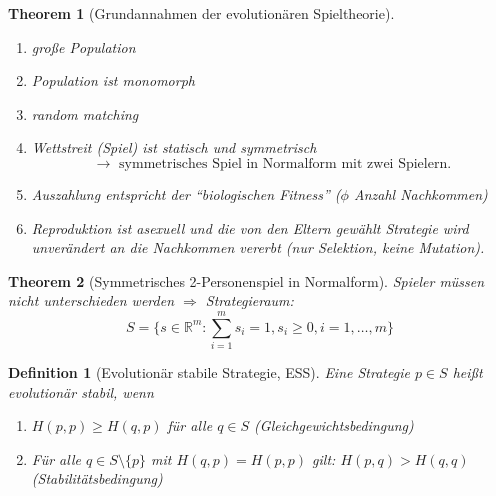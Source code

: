 \documentclass[12pt]{extreport} %
\newcommand{\R}{\mathbb{R}}
\theoremstyle{named}
\newtheorem{unnamedtheorem}{Theorem} \counterwithin{unnamedtheorem}{chapter}
\theoremstyle{itshape}
\newtheorem*{definition}{Definition}
\theoremstyle{normal}
\begin{document}
\begin{unnamedtheorem}[Grundannahmen der evolutionären Spieltheorie]
	\begin{enumerate}
		\item große Population
		\item Population ist monomorph
		\item random matching
		\item Wettstreit (Spiel) ist statisch und symmetrisch
			$$ \rightarrow \text{ symmetrisches Spiel in Normalform mit zwei Spielern}. $$
		\item Auszahlung entspricht der \enquote{biologischen Fitness} ($\phi$ Anzahl Nachkommen)
		\item Reproduktion ist asexuell und die von den Eltern gewählt Strategie wird unverändert an die Nachkommen vererbt (nur Selektion, keine Mutation).
	\end{enumerate}
\end{unnamedtheorem} 
 

\begin{unnamedtheorem}[Symmetrisches 2-Personenspiel in Normalform]
	Spieler müssen nicht unterschieden werden $\Rightarrow$ Strategieraum:
	$$ S = \{ s\in \R^{m} : \sum_{i=1}^{m} s_{i} = 1, s_{i} \geq 0, i = 1, \dotsc, m \} $$
\end{unnamedtheorem}
  
 
\begin{definition}[Evolutionär stabile Strategie, ESS]
	Eine Strategie $p \in S$ hei{\ss}t evolutionär stabil, wenn
	\begin{enumerate}
		\item $H(p,p) \geq H(q, p)$ für alle $q \in S$ (Gleichgewichtsbedingung)
		\item Für alle $q \in S \setminus \{ p \}$ mit $H(q, p) = H(p, p)$ gilt: $H(p, q) > H(q, q)$ (Stabilitätsbedingung)
	\end{enumerate}
\end{definition}  
\end{document}
